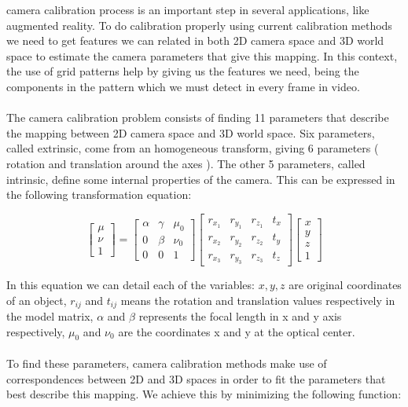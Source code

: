 \documentclass[journal]{IEEEtran}
\begin{document}
 camera calibration process is an important step in several applications, like augmented reality. To do calibration properly using current calibration methods we need to get features we can related in both 2D camera space and 3D world space to estimate the camera parameters that give this mapping. In this context, the use of grid patterns help by giving us the features we need, being the components in the pattern which we must detect in every frame in video.
\\
\\
The camera calibration problem consists of finding 11 parameters that describe the mapping between 2D camera space and 3D world space. Six parameters, called extrinsic, come from an homogeneous transform, giving 6 parameters ( rotation and translation around the axes ). The other 5 parameters, called intrinsic, define some internal properties of the camera. This can be expressed in the following transformation equation:

\begin{equation}
  \begin{bmatrix}
    \mu \\
    \nu \\
      1 
  \end{bmatrix} = 
  \begin{bmatrix}
    \alpha & \gamma & \mu_{0} \\
       0   & \beta  & \nu_{0} \\
       0   &    0   &    1
  \end{bmatrix} 
  \begin{bmatrix}
    r_{x_{1}} & r_{y_{1}} & r_{z_{1}} & t_{x}\\
    r_{x_{2}} & r_{y_{2}} & r_{z_{2}} & t_{y}\\
    r_{x_{3}} & r_{y_{3}} & r_{z_{3}} & t_{z}
  \end{bmatrix} 
  \begin{bmatrix}
    x \\
    y \\
    z \\
    1
  \end{bmatrix}
%
\end{equation}

In this equation we can detail each of the variables: $x,y,z$ are original coordinates of an object, $r_{ij}$ and $t_{ij}$ means the rotation and translation values respectively in the model matrix, $\alpha$ and $\beta$ represents the focal length in x and y axis respectively, $\mu_0$ and $\nu_0$ are the coordinates x and y at the optical center.
\\
\\
To find these parameters, camera calibration methods make use of correspondences between 2D and 3D spaces in order to fit the parameters that best describe this mapping. We achieve this by minimizing the following function:
\end{document}
